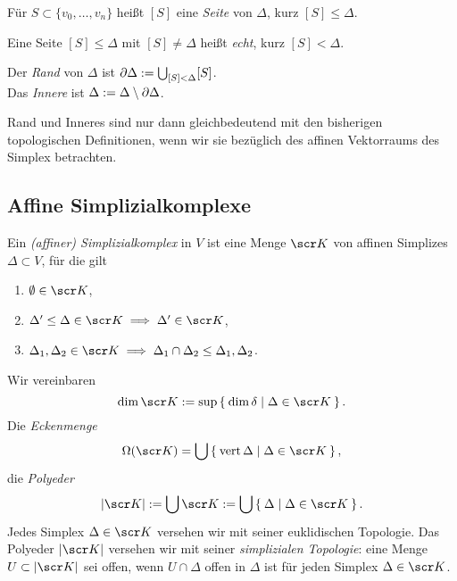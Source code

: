 \begin{df}
	Für $S \subset \{v_0, \dotsc, v_n\}$ heißt $[S]$ eine \emph{Seite} von $\Delta$, kurz $[S] \le \Delta$.

	Eine Seite $[S] \le \Delta$ mit $[S] \neq \Delta$ heißt \emph{echt}, kurz $[S] < \Delta$.

	Der \emph{Rand} von $\Delta$ ist $\partial \Delta := \bigcup_{[S] < \Delta} [S]$. \\
	Das \emph{Innere} ist $\Delta := \Delta \setminus \partial \Delta$.

	\begin{note}
		Rand und Inneres sind nur dann gleichbedeutend mit den bisherigen topologischen Definitionen, wenn wir sie bezüglich des affinen Vektorraums des Simplex betrachten.
	\end{note}
\end{df}


\subsection{Affine Simplizialkomplexe}



\begin{df}
	Ein \emph{(affiner) Simplizialkomplex} in $V$ ist eine Menge $\scr K$ von affinen Simplizes $\Delta \subset V$, für die gilt
	\begin{enumerate}[1), start=0]
		\item
			$\emptyset \in \scr K$,
		\item
			$\Delta' \le \Delta \in \scr K \implies \Delta' \in \scr K$,
		\item
			$\Delta_1, \Delta_2 \in \scr K \implies \Delta_1 \cap \Delta_2 \le \Delta_1, \Delta_2$.
	\end{enumerate}
	Wir vereinbaren
	\[
		\dim \scr K := \sup \Set{ \dim \delta | \Delta \in \scr K }.
	\]
	Die \emph{Eckenmenge}
	\[
		\Omega(\scr K) = \bigcup \Set{ \vert \Delta | \Delta \in \scr K },
	\]
	die \emph{Polyeder}
	\[
		|\scr K| := \bigcup \scr K := \bigcup \Set{ \Delta | \Delta \in \scr K }.
	\]
	Jedes Simplex $\Delta \in \scr K$ versehen wir mit seiner euklidischen Topologie.
	Das Polyeder $|\scr K|$ versehen wir mit seiner \emph{simplizialen Topologie}:
	eine Menge $U \subset |\scr K|$ sei offen, wenn $U \cap \Delta$ offen in $\Delta$ ist für jeden Simplex $\Delta \in \scr K$.
\end{df}

